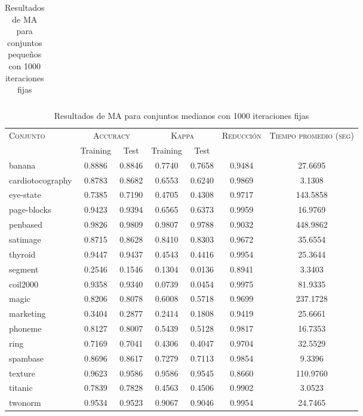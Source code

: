 \begin{table}[]
\begin{tabular}{l c c c c c c}
\hline
\end{tabular}
\caption{Resultados de MA para conjuntos pequeños con 1000 iteraciones fijas}
\label{res-peq-ma}
\end{table}


\begin{table}[]
\centering
\begin{tabular}{l c c c c c c}
\hline
\multirow{2}{*}{\textsc{Conjunto}}
	& \multicolumn{2}{c}{\textsc{Accuracy}}
	& \multicolumn{2}{c}{\textsc{Kappa}}
	& \textsc{Reducción}
	& \textsc{Tiempo promedio (seg)} \\
	& Training & Test
	& Training & Test \\ 
\hline
\hline

banana & 0.8886 & 0.8846 & 0.7740 & 0.7658 & 0.9484 & 27.6695 \\
cardiotocography & 0.8783 & 0.8682 & 0.6553 & 0.6240 & 0.9869 & 3.1308 \\
eye-state & 0.7385 & 0.7190 & 0.4705 & 0.4308 & 0.9717 & 143.5858 \\
page-blocks & 0.9423 & 0.9394 & 0.6565 & 0.6373 & 0.9959 & 16.9769 \\
penbased & 0.9826 & 0.9809 & 0.9807 & 0.9788 & 0.9032 & 448.9862 \\
satimage & 0.8715 & 0.8628 & 0.8410 & 0.8303 & 0.9672 & 35.6554 \\
thyroid & 0.9447 & 0.9437 & 0.4543 & 0.4416 & 0.9954 & 25.3644 \\
segment & 0.2546 & 0.1546 & 0.1304 & 0.0136 & 0.8941 & 3.3403 \\
coil2000 & 0.9358 & 0.9340 & 0.0739 & 0.0454 & 0.9975 & 81.9335 \\
magic & 0.8206 & 0.8078 & 0.6008 & 0.5718 & 0.9699 & 237.1728 \\
marketing & 0.3404 & 0.2877 & 0.2414 & 0.1808 & 0.9419 & 25.6661 \\
phoneme & 0.8127 & 0.8007 & 0.5439 & 0.5128 & 0.9817 & 16.7353 \\
ring & 0.7169 & 0.7041 & 0.4306 & 0.4047 & 0.9704 & 32.5529 \\
spambase & 0.8696 & 0.8617 & 0.7279 & 0.7113 & 0.9854 & 9.3396 \\
texture & 0.9623 & 0.9586 & 0.9586 & 0.9545 & 0.8660 & 110.9760 \\
titanic & 0.7839 & 0.7828 & 0.4563 & 0.4506 & 0.9902 & 3.0523 \\
twonorm & 0.9534 & 0.9523 & 0.9067 & 0.9046 & 0.9954 & 24.7465 \\

\hline
\end{tabular}
\caption{Resultados de MA para conjuntos medianos con 1000 iteraciones fijas}
\label{res-med-ma}
\end{table}


